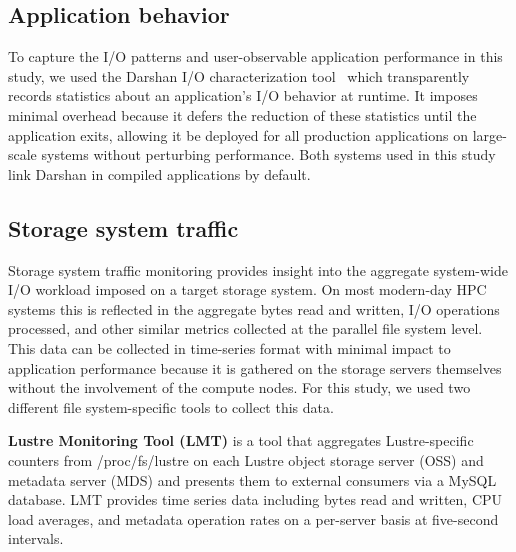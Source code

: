 \subsection{Application behavior} \label{sec:methods/darshan}

To capture the I/O patterns and user-observable application performance in this study, we used the Darshan I/O characterization tool~\cite{carns200924} which transparently records statistics about an application's I/O behavior at runtime.
It imposes minimal overhead because it defers the reduction of these statistics until the application exits,
allowing it be deployed for all production applications on large-scale systems without perturbing performance.  Both systems used in this study link Darshan in compiled applications by default.

\subsection{Storage system traffic} \label{sec:methods/storagesystraffic}

Storage system traffic monitoring provides insight into the aggregate system-wide I/O workload imposed on a target storage system.
On most modern-day HPC systems this is reflected in the aggregate bytes read and written, I/O operations processed, and other similar metrics collected at the parallel file system level.
This data can be collected in time-series format with minimal impact to application performance because it is gathered on the storage servers themselves without the involvement of the compute nodes.
For this study, we used two different file system-specific tools to collect this data.

\label{sec:methods/lmt}
\textbf{Lustre Monitoring Tool (LMT)} is a tool that aggregates Lustre-specific counters from /proc/fs/lustre on each Lustre object storage server (OSS) and metadata server (MDS) and presents them to external consumers via a MySQL database.
LMT provides time series data including bytes read and written, CPU load averages, and metadata operation rates on a per-server basis at five-second intervals.

